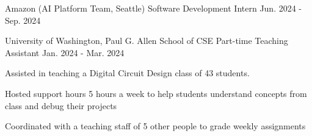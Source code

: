 \vspace{\sectionpadding}
\vspace{-0.5ex}
\vspace{-1.5ex}
\entry
    {Amazon (AI Platform Team, Seattle)}
    {Software Development Intern}
    {Jun. 2024 - Sep. 2024}
    {
    }

\entry
    {University of Washington, Paul G. Allen School of CSE}
    {Part-time Teaching Assistant}
    {Jan. 2024 - Mar. 2024}
    {
    Assisted in teaching a Digital Circuit Design class of 43 students.
    \begin{condenseditemize}
        \item Hosted support hours 5 hours a week to help students understand concepts from class and debug their projects
        \item Coordinated with a teaching staff of 5 other people to grade weekly assignments
    \end{condenseditemize}
    }

